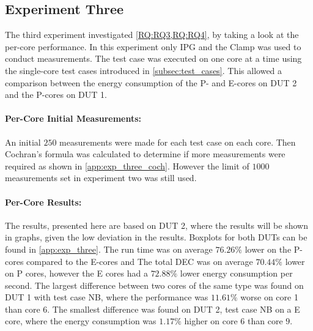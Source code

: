 \subsection{Experiment Three}\label{subsec:exp_three}

The third experiment investigated \cref{RQ:RQ3,RQ:RQ4}, by taking a look at the per-core performance. In this experiment only IPG and the Clamp was used to conduct measurements. The test case was executed on one core at a time using the single-core test cases introduced in \cref{subsec:test_cases}. This allowed a comparison between the energy consumption of the P- and E-cores on DUT 2 and the P-cores on DUT 1.


\paragraph{Per-Core Initial Measurements:} An initial $250$ measurements were made for each test case on each core. Then Cochran's formula was calculated to determine if more measurements were required as shown in \cref{app:exp_three_coch}. However the limit of $1000$ measurements set in experiment two was still used.




\paragraph{Per-Core Results:} The results, presented here are based on DUT 2, where the results will be shown in graphs, given the low deviation in the results. Boxplots for both DUTs can be found in \cref{app:exp_three}. The run time was on average $76.26\%$ lower on the P-cores compared to the E-cores and The total DEC was on average $70.44\%$ lower on P cores, however the E cores had a $72.88\%$ lower energy consumption per second. %
The largest difference between two cores of the same type was found on DUT 1 with test case NB, where the performance was $11.61\%$ worse on core 1 than core 6. The smallest difference was found on DUT 2, test case NB on a E core, where the energy consumption was $1.17\%$ higher on core $6$ than core $9$.




